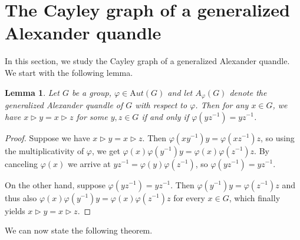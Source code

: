\documentclass[english,11pt]{amsart}
\newtheorem{Lemma}[Theorem]{Lemma}
\newcommand{\Aut}{{\mathrm Aut}}
\begin{document}
\bigskip

 \section{The Cayley graph of a generalized Alexander quandle}
\bigskip

In this section, we study the Cayley graph of a generalized Alexander quandle.
We start with the following lemma.

\begin{Lemma}
\label{fixedpts}
   Let $G$ be a group, $\varphi \in \Aut(G)$ and let $A_\varphi(G)$ denote the generalized Alexander quandle of $G$ with respect to $\varphi$. Then for any $x \in G$, we have $x \rhd y = x \rhd z$ for some $y,z \in G$ if and only if $\varphi(yz^{-1})=yz^{-1}$.
\end{Lemma}
\begin{proof}
    Suppose we have $x \rhd y = x \rhd z$. Then $\varphi(xy^{-1})y=\varphi(xz^{-1})z$, so using the multiplicativity of $\varphi$, we get $\varphi(x)\varphi(y^{-1})y=\varphi(x)\varphi(z^{-1})z$. By canceling $\varphi(x)$ we arrive at $yz^{-1}=\varphi(y)\varphi(z^{-1})$, so $\varphi(yz^{-1})=yz^{-1}$.
    
    On the other hand, suppose $\varphi(yz^{-1})=yz^{-1}$. Then $\varphi(y^{-1})y=\varphi(z^{-1})z$ and thus also $\varphi(x)\varphi(y^{-1})y=\varphi(x)\varphi(z^{-1})z$ for every $x \in G$, which finally yields $x \rhd y = x \rhd z$.
\end{proof}

We can now state the following theorem.
\end{document}
